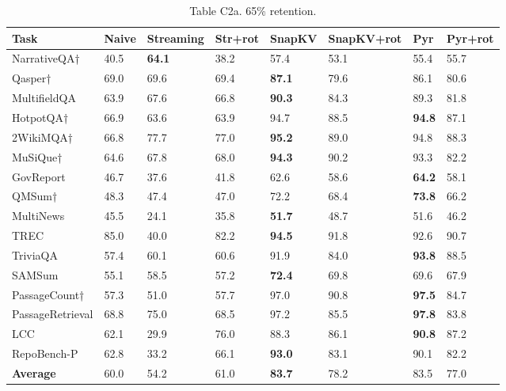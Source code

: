 \documentclass[10pt,letterpaper]{article}
\begin{document}
\begin{table}[H]
\centering
\small
\caption*{Table C2a. 65\% retention.}
\begin{tabular}{@{}llllllll@{}}
\toprule
Task & Naive & Streaming & Str+rot & SnapKV & SnapKV+rot & Pyr &
Pyr+rot\\
\midrule
    NarrativeQA† & 40.5 & \textbf{64.1} & 38.2 & 57.4 & 53.1 & 55.4 & 55.7\\
    Qasper† & 69.0 & 69.6 & 69.4 & \textbf{87.1} & 79.6 & 86.1 & 80.6\\
    MultifieldQA & 63.9 & 67.6 & 66.8 & \textbf{90.3} & 84.3 & 89.3 & 81.8\\
    HotpotQA† & 66.9 & 63.6 & 63.9 & 94.7 & 88.5 & \textbf{94.8} & 87.1\\
    2WikiMQA† & 66.8 & 77.7 & 77.0 & \textbf{95.2} & 89.0 & 94.8 & 88.3\\
    MuSiQue† & 64.6 & 67.8 & 68.0 & \textbf{94.3} & 90.2 & 93.3 & 82.2\\
    GovReport & 46.7 & 37.6 & 41.8 & 62.6 & 58.6 & \textbf{64.2} & 58.1\\
    QMSum† & 48.3 & 47.4 & 47.0 & 72.2 & 68.4 & \textbf{73.8} & 66.2\\
    MultiNews & 45.5 & 24.1 & 35.8 & \textbf{51.7} & 48.7 & 51.6 & 46.2\\
    TREC & 85.0 & 40.0 & 82.2 & \textbf{94.5} & 91.8 & 92.6 & 90.7\\
    TriviaQA & 57.4 & 60.1 & 60.6 & 91.9 & 84.0 & \textbf{93.8} & 88.5\\
    SAMSum & 55.1 & 58.5 & 57.2 & \textbf{72.4} & 69.8 & 69.6 & 67.9\\
    PassageCount† & 57.3 & 51.0 & 57.7 & 97.0 & 90.8 & \textbf{97.5} & 84.7\\
    PassageRetrieval & 68.8 & 75.0 & 68.5 & 97.2 & 85.5 & \textbf{97.8} & 83.8\\
    LCC & 62.1 & 29.9 & 76.0 & 88.3 & 86.1 & \textbf{90.8} & 87.2\\
    RepoBench-P & 62.8 & 33.2 & 66.1 & \textbf{93.0} & 83.1 & 90.1 & 82.2\\
    \textbf{Average} & 60.0 & 54.2 & 61.0 & \textbf{83.7} & 78.2 & 83.5 & 77.0\\
\bottomrule
\end{tabular}
\end{table}
\end{document}
